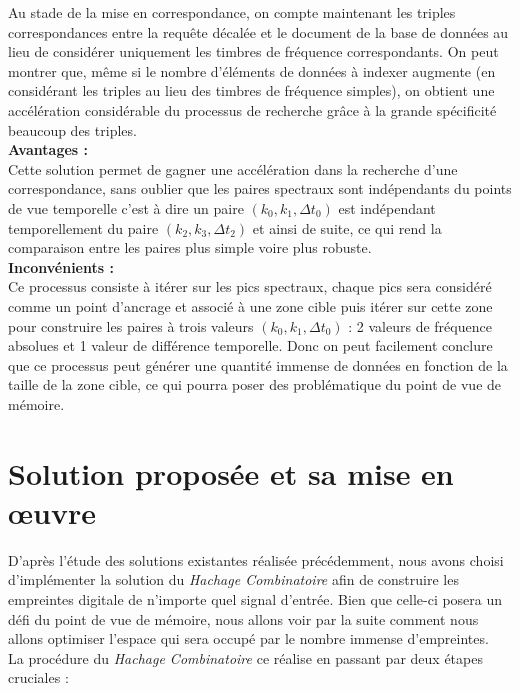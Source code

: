 \documentclass[11pt, report, french]{scrreprt}
\begin{document}
Au stade de la mise en correspondance, on compte maintenant les triples correspondances entre la requête décalée et le document de la base de données au lieu de considérer uniquement les timbres de fréquence correspondants. On peut montrer que, même si le nombre d'éléments de données à indexer augmente (en considérant les triples au lieu des timbres de fréquence simples), on obtient une accélération considérable du processus de recherche grâce à la grande spécificité beaucoup des triples.\\

\newpage
\textbf{Avantages :}\\

Cette solution permet de gagner une accélération dans la recherche d'une correspondance, sans oublier que les paires spectraux sont indépendants du points de vue temporelle c'est à dire un paire $ (k_0,k_1,\Delta t_0) $ est indépendant temporellement du paire $ (k_2,k_3,\Delta t_2) $ et ainsi de suite, ce qui rend la comparaison entre les paires plus simple voire plus robuste.\\

\textbf{Inconvénients :}\\

Ce processus consiste à itérer sur les pics spectraux, chaque pics sera considéré comme un point d'ancrage et associé à une zone cible puis itérer sur cette zone pour construire les paires à trois valeurs $(k_0,k_1,\Delta t_0)$ : 2 valeurs de fréquence absolues et 1 valeur de diﬀérence temporelle. Donc on peut facilement conclure que ce processus peut générer une quantité immense de données en fonction de la taille de la zone cible, ce qui pourra poser des problématique du point de vue de mémoire.

\section{Solution proposée et sa mise en œuvre}

D'après l'étude des solutions existantes réalisée précédemment, nous avons choisi d'implémenter la solution du \textit{Hachage Combinatoire} afin de construire les empreintes digitale de n'importe quel signal d'entrée. Bien que celle-ci posera un défi du point de vue de mémoire, nous allons voir par la suite comment nous allons optimiser l'espace qui sera occupé par le nombre immense d'empreintes.\\

La procédure du \textit{Hachage Combinatoire} ce réalise en passant par deux étapes cruciales :\\
\end{document}

